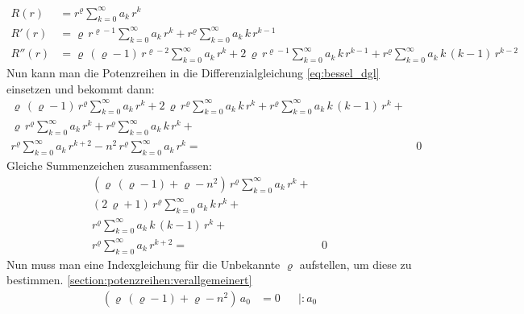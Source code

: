 \begin{refsection}
\begin{align*}
	R \left( r \right)
	&=
	r^{\varrho}
	\sum_{k=0}^{\infty} a_k \, r^k
\\
	R'\left( r \right)
	&=
	\varrho \, r^{\varrho - 1}
	\sum_{k=0}^{\infty} a_k \, r^k
	+
	r^{\varrho}
	\sum_{k=0}^{\infty} a_k \, k \, r^{k - 1}
\\
	R'' \left( r \right)
	&=
	\varrho \, \left( \varrho - 1 \right) \, r^{\varrho - 2}
	\sum_{k=0}^{\infty} a_k \, r^k
	+
	2 \, \varrho \, r^{\varrho - 1}
	\sum_{k=0}^{\infty} a_k \, k \, r^{k - 1}
	+
	r^{\varrho}
	\sum_{k=0}^{\infty} a_k \, k \, \left( k - 1 \right) \, r^{k - 2}	
\end{align*}
Nun kann man die Potenzreihen in die Differenzialgleichung \ref{eq:bessel_dgl} einsetzen und bekommt dann:
\begin{align*}
	\varrho \, \left( \varrho - 1 \right) \, r^{\varrho}
	\sum_{k=0}^{\infty} a_k \, r^k
	+
	2 \, \varrho \, r^{\varrho}
	\sum_{k=0}^{\infty} a_k \, k \, r^k
	+
	r^{\varrho}
	\sum_{k=0}^{\infty} a_k \, k \, \left( k - 1 \right) \, r^k
	+ \\
	\varrho \, r^{\varrho}
	\sum_{k=0}^{\infty} a_k \, r^k
	+
	r^{\varrho}
	\sum_{k=0}^{\infty} a_k \, k \, r^k
	+\\
	r^{\varrho}
	\sum_{k=0}^{\infty} a_k \, r^{k + 2}
	-
	n^2 \, r^{\varrho}
	\sum_{k=0}^{\infty} a_k \, r^k
	= & \, 0
\end{align*}
Gleiche Summenzeichen zusammenfassen:
\begin{align*}
	\left(
	\varrho \, \left( \varrho - 1 \right)
	+
	\varrho
	-
	n^2
	\right)
	\, r^{\varrho}
	\sum_{k=0}^{\infty} a_k \, r^k
	+ \\
	\left(	
	2 \, \varrho
	+
	1
	\right)
	\, r^{\varrho}
	\sum_{k=0}^{\infty} a_k \, k \, r^k
	+ \\
	r^{\varrho}
	\sum_{k=0}^{\infty} a_k \, k \, \left( k - 1 \right) \, r^k
	+ \\
	r^{\varrho}
	\sum_{k=0}^{\infty} a_k \, r^{k + 2}
	= & \, 0
\end{align*}
Nun muss man eine Indexgleichung für die Unbekannte $\varrho$ aufstellen, um diese zu bestimmen.
\ref{section:potenzreihen:verallgemeinert}
\begin{align*}
	\left( \varrho \, \left( \varrho -1 \right) + \varrho - n^2 \right) \, a_0 &= 0 && \left| :a_0 \right. \\

\end{align*}
\end{refsection}
